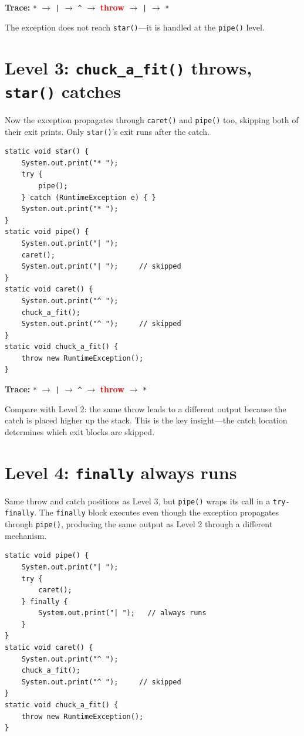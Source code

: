 \documentclass[twoside=false,DIV=14]{scrartcl}
\begin{document}
\textbf{Trace:} \texttt{*} $\rightarrow$ \texttt{|} $\rightarrow$ \texttt{\^{}} $\rightarrow$ \textbf{\textcolor{red}{throw}} $\rightarrow$ \texttt{|} $\rightarrow$ \texttt{*}

The exception does not reach \texttt{star()}---it is handled at the \texttt{pipe()} level.


\section*{Level 3: \texttt{chuck\_a\_fit()} throws, \texttt{star()} catches}

Now the exception propagates through \texttt{caret()} and \texttt{pipe()} too, skipping both of their exit prints.  Only \texttt{star()}'s exit runs after the catch.

\begin{lstlisting}
static void star() {
    System.out.print("* ");
    try {
        pipe();
    } catch (RuntimeException e) { }
    System.out.print("* ");
}
static void pipe() {
    System.out.print("| ");
    caret();
    System.out.print("| ");     // skipped
}
static void caret() {
    System.out.print("^ ");
    chuck_a_fit();
    System.out.print("^ ");     // skipped
}
static void chuck_a_fit() {
    throw new RuntimeException();
}
\end{lstlisting}

\textbf{Trace:} \texttt{*} $\rightarrow$ \texttt{|} $\rightarrow$ \texttt{\^{}} $\rightarrow$ \textbf{\textcolor{red}{throw}} $\rightarrow$ \texttt{*}

Compare with Level 2: the same throw leads to a different output because the catch is placed higher up the stack.  This is the key insight---the catch location determines which exit blocks are skipped.

\section*{Level 4: \texttt{finally} always runs}

Same throw and catch positions as Level 3, but \texttt{pipe()} wraps its call in a \texttt{try-finally}.  The \texttt{finally} block executes even though the exception propagates through \texttt{pipe()}, producing the same output as Level 2 through a different mechanism.

\begin{lstlisting}
static void pipe() {
    System.out.print("| ");
    try {
        caret();
    } finally {
        System.out.print("| ");   // always runs
    }
}
static void caret() {
    System.out.print("^ ");
    chuck_a_fit();
    System.out.print("^ ");     // skipped
}
static void chuck_a_fit() {
    throw new RuntimeException();
}
\end{lstlisting}
\end{document}
